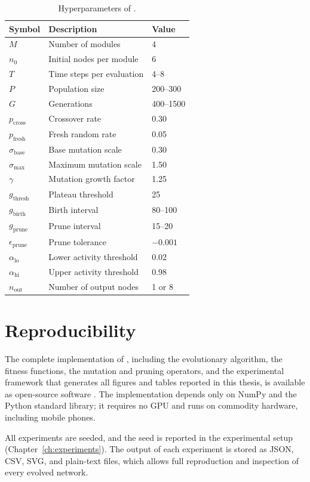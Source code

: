 \begin{table}[h]
  \centering
  \small
  \caption{Hyperparameters of \modnet{}.}
  \label{tab:hyperparameters}
  \begin{tabular}{lll}
    \toprule
    \textbf{Symbol} & \textbf{Description} & \textbf{Value} \\
    \midrule
    $M$ & Number of modules & 4 \\
    $n_0$ & Initial nodes per module & 6 \\
    $T$ & Time steps per evaluation & 4--8 \\
    $P$ & Population size & 200--300 \\
    $G$ & Generations & 400--1500 \\
    $p_{\text{cross}}$ & Crossover rate & 0.30 \\
    $p_{\text{fresh}}$ & Fresh random rate & 0.05 \\
    $\sigma_{\text{base}}$ & Base mutation scale & 0.30 \\
    $\sigma_{\max}$ & Maximum mutation scale & 1.50 \\
    $\gamma$ & Mutation growth factor & 1.25 \\
    $g_{\text{thresh}}$ & Plateau threshold & 25 \\
    $g_{\text{birth}}$ & Birth interval & 80--100 \\
    $g_{\text{prune}}$ & Prune interval & 15--20 \\
    $\epsilon_{\text{prune}}$ & Prune tolerance & $-0.001$ \\
    $\alpha_{\text{lo}}$ & Lower activity threshold & 0.02 \\
    $\alpha_{\text{hi}}$ & Upper activity threshold & 0.98 \\
    $n_{\text{out}}$ & Number of output nodes & 1 or 8 \\
    \bottomrule
  \end{tabular}
\end{table}

\section{Reproducibility}
\label{sec:reproducibility}

The complete implementation of \modnet{}, including the evolutionary
algorithm, the fitness functions, the mutation and pruning operators,
and the experimental framework that generates all figures and tables
reported in this thesis, is available as open-source software
\citep{modnet2026code}. The implementation depends only on NumPy and
the Python standard library; it requires no GPU and runs on commodity
hardware, including mobile phones.

All experiments are seeded, and the seed is reported in the
experimental setup (Chapter~\ref{ch:experiments}). The output of each
experiment is stored as JSON, CSV, SVG, and plain-text files, which
allows full reproduction and inspection of every evolved network.
